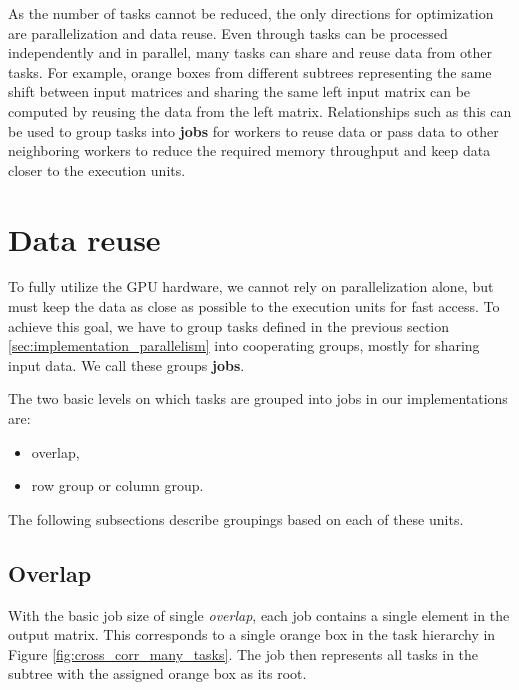 
As the number of tasks cannot be reduced, the only directions for optimization are parallelization and data reuse. Even through tasks can be processed independently and in parallel, many tasks can share and reuse data from other tasks. For example, orange boxes from different subtrees representing the same shift between input matrices and sharing the same left input matrix can be computed by reusing the data from the left matrix. Relationships such as this can be used to group tasks into \textbf{jobs} for workers to reuse data or pass data to other neighboring workers to reduce the required memory throughput and keep data closer to the execution units. 

\section{Data reuse}
\label{sec:data_reuse}
To fully utilize the GPU hardware, we cannot rely on parallelization alone, but must keep the data as close as possible to the execution units for fast access. To achieve this goal, we have to group tasks defined in the previous section \ref{sec:implementation_parallelism} into cooperating groups, mostly for sharing input data. We call these groups \textbf{jobs}.

The two basic levels on which tasks are grouped into jobs in our implementations are:
\begin{itemize}
	\item overlap,
	\item row group or column group.
\end{itemize}

The following subsections describe groupings based on each of these units.

\subsection{Overlap}
\label{sec:data_reuse_overlap}

With the basic job size of single \textit{overlap}, each job contains a single element in the output matrix. This corresponds to a single orange box in the task hierarchy in Figure \ref{fig:cross_corr_many_tasks}. The job then represents all tasks in the subtree with the assigned orange box as its root.

